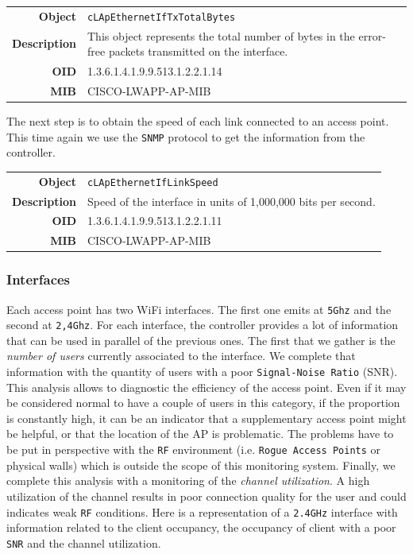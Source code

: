 \begin{tabular}{|r l|}
\hline
\textbf{Object} & \texttt{cLApEthernetIfTxTotalBytes} \\
\textbf{Description} & \parbox{11cm}{This object represents the total number of bytes in the error-free packets transmitted on the interface.} \\
\textbf{OID} & 1.3.6.1.4.1.9.9.513.1.2.2.1.14 \\
\textbf{MIB} & CISCO-LWAPP-AP-MIB \\
\hline
\end{tabular}

The next step is to obtain the speed of each link connected to an access point. This time again we use the \texttt{SNMP} protocol to get the information from the controller.

\begin{tabular}{|r l|}
\hline
\textbf{Object} & \texttt{cLApEthernetIfLinkSpeed} \\
\textbf{Description} & \parbox{11cm}{Speed of the interface in units of 1,000,000 bits per second.} \\
\textbf{OID} & 1.3.6.1.4.1.9.9.513.1.2.2.1.11 \\
\textbf{MIB} & CISCO-LWAPP-AP-MIB \\
\hline
\end{tabular} 

\subsubsection*{Interfaces}
Each access point has two WiFi interfaces. The first one emits at \texttt{5Ghz} and the second at \texttt{2,4Ghz}. For each interface, the controller provides a lot of information that can be used in parallel of the previous ones. The first that we gather is the \textit{number of users} currently associated to the interface. We complete that information with the quantity of users with a poor \texttt{Signal-Noise Ratio} (SNR). This analysis allows to diagnostic the efficiency of the access point. Even if it may be considered normal to have a couple of users in this category, if the proportion is constantly high, it can be an indicator that a supplementary access point might be helpful, or that the location of the AP is problematic. The problems have to be put in perspective with the \texttt{RF} environment (i.e. \texttt{Rogue Access Points} or physical walls) which is outside the scope of this monitoring system. 
Finally, we complete this analysis with a monitoring of the \emph{channel utilization}. A high utilization of the channel results in poor connection quality for the user and could indicates weak \texttt{RF} conditions.
Here is a representation of a \texttt{2.4GHz} interface with information related to the client occupancy, the occupancy of client with a poor \texttt{SNR} and the channel utilization. 

